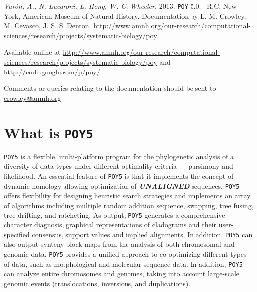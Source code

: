 \documentclass[11pt]{book}
\newcommand{\commandstyle}[1]{\texttt{#1}}
\newcommand{\poy}{\commandstyle{POY5}\xspace}
\begin{document}
\begin{flushleft}
\vspace*{0.25cm}
\emph{Var\'on, A., N. Lucaroni, L. Hong, W. C. Wheeler.} 2013. \texttt{POY} 5.0. \buildnumber\ R.C. New York, 
American Museum of Natural History. Documentation by L. M. Crowley, M. Cevasco, J. S. S. Denton. 
\url{http://www.amnh.org/our-research/computational-sciences/research/projects/systematic-biology/poy}

\vspace*{0.25cm}

Available online at
\url{http://www.amnh.org/our-research/computational-sciences/research/projects/systematic-biology/poy}
and
\url{http://code.google.com/p/poy/} 

Comments or queries relating to the documentation should be sent to \href{mailto:crowley@amnh.org}{crowley@amnh.org}
\end{flushleft}

\newpage

\renewcommand{\cftsecdotsep}{2}
\tableofcontents


\chapter{What is \poy}

\poy is a flexible, multi-platform program for the phylogenetic analysis of a diversity of data types under different optimality criteria ---
parsimony and likelihood.
An essential feature of \poy is that it implements the concept of dynamic homology \cite{wheeler2001a, wheeler2001} allowing 
optimization of   {\bf \emph{UNALIGNED}} sequences. \poy offers flexibility for designing heuristic search strategies and implements an array of 
algorithms including multiple random addition sequence, swapping, tree fusing, tree drifting, and ratcheting. As output, \poy 
generates a comprehensive character diagnosis, graphical representations of cladograms and their user-specified consensus, 
support values and implied alignments.  In addition, \poy can also output synteny block maps from the analysis of both 
chromosomal and genomic data. \poy provides a unified approach to co-optimizing different types of data, such as morphological 
and molecular sequence data. In addition, \poy can analyze entire chromosomes and genomes, taking into account large-scale 
genomic events (translocations, inversions, and duplications).
\end{document}
